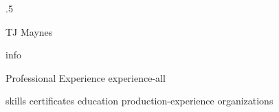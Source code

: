 \documentclass[10pt]{article}
\begin{document}
\moveleft.5\hoffset\centerline{\huge TJ Maynes}
{info}

\begin{section}{Professional Experience}
  {experience-all}
\end{section}

{skills}
{certificates}
{education}
{production-experience}
{organizations}
\end{document}
